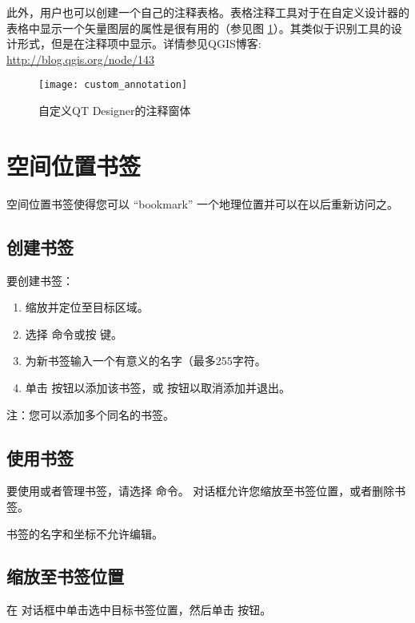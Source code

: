 此外，用户也可以创建一个自己的注释表格。表格注释工具对于在自定义设计器的表格中显示一个矢量图层的属性是很有用的（参见图 \ref{fig:custom-annotations}）。其类似于识别工具的设计形式，但是在注释项中显示。详情参见QGIS博客: \url{http://blog.qgis.org/node/143}

\begin{figure}[ht]
   \centering
   \texttt{[image: custom\_annotation]}
   \caption{自定义QT Designer的注释窗体 \nixcaption}
   \label{fig:custom-annotations}
\end{figure}

\newpage

\section{空间位置书签}\label{sec:bookmarks}

空间位置书签使得您可以 ``bookmark'' 一个地理位置并可以在以后重新访问之。

\subsection{创建书签}
要创建书签：
\begin{enumerate}
\item 缩放并定位至目标区域。
\item 选择  \arrow {} 命令或按  键。
\item 为新书签输入一个有意义的名字（最多255字符。
\item 单击  按钮以添加该书签，或  按钮以取消添加并退出。
\end{enumerate}

注：您可以添加多个同名的书签。

\subsection{使用书签}
要使用或者管理书签，请选择  \arrow {} 命令。  对话框允许您缩放至书签位置，或者删除书签。

书签的名字和坐标不允许编辑。

\subsection{缩放至书签位置}
在  对话框中单击选中目标书签位置，然后单击  按钮。

